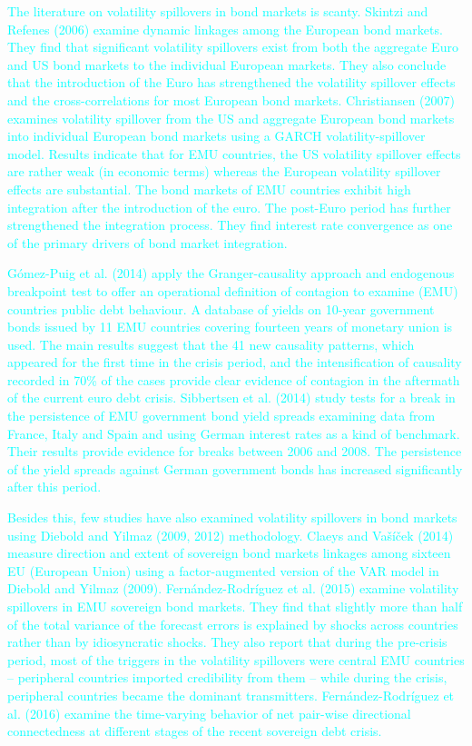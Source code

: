 \documentclass[12pt,bibliography=totoc]{article}
\begin{document}
\textcolor{cyan}{The literature on volatility spillovers in bond markets is scanty. Skintzi and Refenes (2006) examine dynamic linkages among the European bond markets. They find that significant volatility spillovers exist from both the aggregate Euro and US bond markets to the individual European markets. They also conclude that the introduction of the Euro has strengthened the volatility spillover effects and the cross-correlations for most European bond markets. Christiansen (2007) examines volatility spillover from the US and aggregate European bond markets into individual European bond markets using a GARCH volatility-spillover model. Results indicate that for EMU countries, the US volatility spillover effects are rather weak (in economic terms) whereas the European volatility spillover effects are substantial. The bond markets of EMU countries exhibit high integration after the introduction of the euro. The post-Euro period has further strengthened the integration process. They find interest rate convergence as one of the primary drivers of bond market integration.}

\textcolor{cyan}{Gómez-Puig et al. (2014) apply the Granger-causality approach and endogenous breakpoint test to offer an operational definition of contagion to examine (EMU) countries public debt behaviour. A database of yields on 10-year government bonds issued by 11 EMU countries covering fourteen years of monetary union is used. The main results suggest that the 41 new causality patterns, which appeared for the first time in the crisis period, and the intensification of causality recorded in 70\% of the cases provide clear evidence of contagion in the aftermath of the current euro debt crisis. Sibbertsen et al. (2014) study tests for a break in the persistence of EMU government bond yield spreads examining data from France, Italy and Spain and using German interest rates as a kind of benchmark. Their results provide evidence for breaks between 2006 and 2008. The persistence of the yield spreads against German government bonds has increased significantly after this period.}

\textcolor{cyan}{Besides this, few studies have also examined volatility spillovers in bond markets using Diebold and Yilmaz (2009, 2012) methodology. Claeys and Vašíček (2014) measure direction and extent of sovereign bond markets linkages among sixteen EU (European Union) using a factor-augmented version of the VAR model in Diebold and Yilmaz (2009). Fernández-Rodríguez et al. (2015) examine volatility spillovers in EMU sovereign bond markets. They find that slightly more than half of the total variance of the forecast errors is explained by shocks across countries rather than by idiosyncratic shocks. They also report that during the pre-crisis period, most of the triggers in the volatility spillovers were central EMU countries – peripheral countries imported credibility from them – while during the crisis, peripheral countries became the dominant transmitters. Fernández-Rodríguez et al. (2016) examine the time-varying behavior of net pair-wise directional connectedness at different stages of the recent sovereign debt crisis.}
\end{document}
